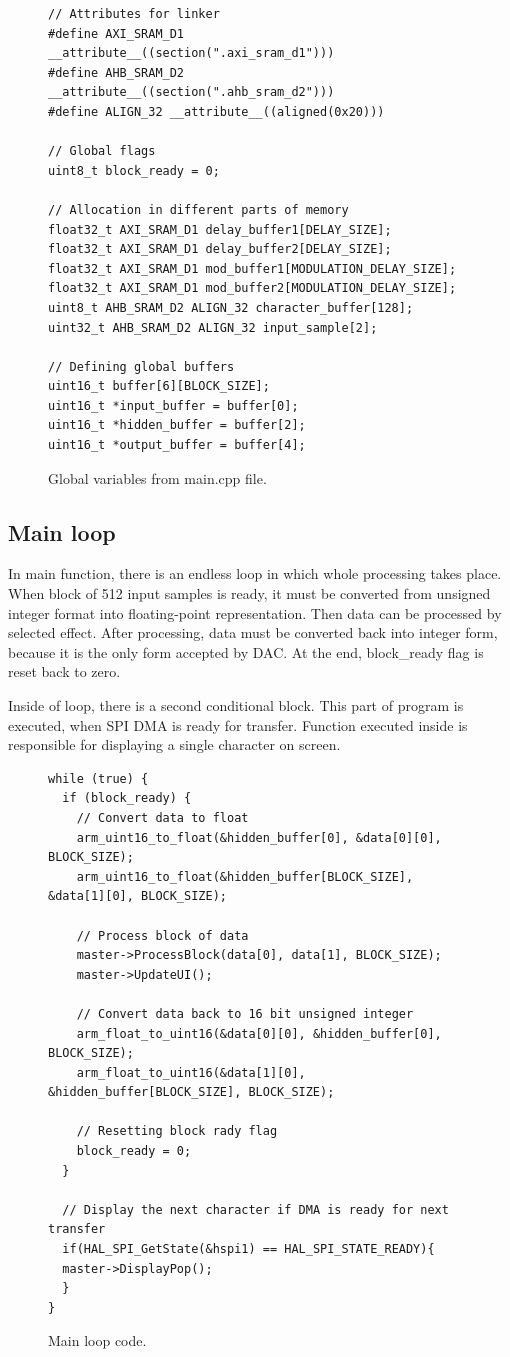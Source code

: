 \documentclass[a4paper,twoside,12pt]{book}
\begin{document}
\begin{figure}[H]
\centering
\begin{lstlisting}
// Attributes for linker
#define AXI_SRAM_D1 __attribute__((section(".axi_sram_d1")))
#define AHB_SRAM_D2 __attribute__((section(".ahb_sram_d2")))
#define ALIGN_32 __attribute__((aligned(0x20)))

// Global flags
uint8_t block_ready = 0;

// Allocation in different parts of memory
float32_t AXI_SRAM_D1 delay_buffer1[DELAY_SIZE];
float32_t AXI_SRAM_D1 delay_buffer2[DELAY_SIZE];
float32_t AXI_SRAM_D1 mod_buffer1[MODULATION_DELAY_SIZE];
float32_t AXI_SRAM_D1 mod_buffer2[MODULATION_DELAY_SIZE];
uint8_t AHB_SRAM_D2 ALIGN_32 character_buffer[128];
uint32_t AHB_SRAM_D2 ALIGN_32 input_sample[2];

// Defining global buffers
uint16_t buffer[6][BLOCK_SIZE];
uint16_t *input_buffer = buffer[0];
uint16_t *hidden_buffer = buffer[2];
uint16_t *output_buffer = buffer[4];
\end{lstlisting}
\caption{Global variables from main.cpp file.}
\label{fig:vars}
\end{figure}

\subsection{Main loop}
In main function, there is an endless loop in which whole processing takes place.
When block of 512 input samples is ready, it must be converted from unsigned integer
format into floating-point representation.
Then data can be processed by selected effect.
After processing, data must be converted back into integer form, because
it is the only form accepted by DAC.
At the end, block\_ready flag is reset back to zero.

Inside of loop, there is a second conditional block.
This part of program is executed, when SPI DMA is ready for transfer.
Function executed inside is responsible for displaying a single character on screen.

\begin{figure}[H]
\centering
\begin{lstlisting}
while (true) {
  if (block_ready) {
    // Convert data to float
    arm_uint16_to_float(&hidden_buffer[0], &data[0][0], BLOCK_SIZE);
    arm_uint16_to_float(&hidden_buffer[BLOCK_SIZE], &data[1][0], BLOCK_SIZE);

    // Process block of data
    master->ProcessBlock(data[0], data[1], BLOCK_SIZE);
    master->UpdateUI();

    // Convert data back to 16 bit unsigned integer
    arm_float_to_uint16(&data[0][0], &hidden_buffer[0], BLOCK_SIZE);
    arm_float_to_uint16(&data[1][0], &hidden_buffer[BLOCK_SIZE], BLOCK_SIZE);

    // Resetting block rady flag
    block_ready = 0;
  }

  // Display the next character if DMA is ready for next transfer
  if(HAL_SPI_GetState(&hspi1) == HAL_SPI_STATE_READY){
  master->DisplayPop();
  }
}
\end{lstlisting}
\caption{Main loop code.}
\label{fig:loop}
\end{figure}
\end{document}

